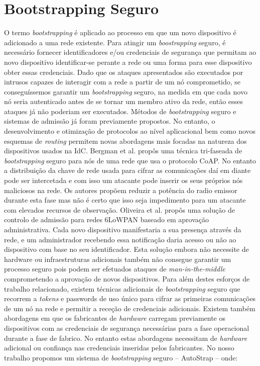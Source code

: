 \documentclass{llncs}
\begin{document}
\section{Bootstrapping Seguro}
\label{sec:secure_bootstrapping}
O termo \textit{bootstrapping} é aplicado ao processo em que um novo dispositivo é adicionado a uma rede existente. Para atingir um \textit{boostrapping} seguro, é necessário fornecer identificadores e/ou credenciais de segurança que permitam ao novo dispositivo identificar-se perante a rede ou uma forma para esse dispositivo obter essas credenciais. Dado que os ataques apresentados são executados por intrusos capazes de interagir com a rede a partir de um nó comprometido, se conseguíssemos garantir um \textit{bootstrapping} seguro, na medida em que cada novo nó seria autenticado antes de se tornar um membro ativo da rede, então esses ataques já não poderiam ser executados.
Métodos de \textit{bootstrapping} seguro e sistemas de admissão já foram previamente propostos. No entanto, o desenvolvimento e otimização de protocolos ao nível aplicacional bem como novos esquemas de \textit{routing} permitem novas abordagens mais focadas na natureza dos dispositivos usados na \ac{IdC}. Bergman et al.\cite{Bergmann2012} propôs uma técnica tri-faseada de \textit{bootstrapping} seguro para nós de uma rede que usa o protocolo \ac{CoAP}. No entanto a distribuição da chave de rede usada para cifrar as comunicações daí em diante pode ser intercetada e com isso um atacante pode inserir os seus próprios nós maliciosos na rede. Os autores propõem reduzir a potência do radio emissor durante esta fase mas não é certo que isso seja impedimento para um atacante com elevados recursos de observação.
Oliveira et al. \cite{Oliveira2013} propôs uma solução de controlo de admissão para redes \ac{6LoWPAN} baseado em aprovação administrativa. Cada novo dispositivo manifestaria a sua presença através da rede, e um administrador recebendo essa notificação daria acesso ou não ao dispositivo com base no seu identificador. Esta solução embora não necessite de hardware ou infraestruturas adicionais também não consegue garantir um processo seguro pois podem ser efetuados ataques de \textit{man-in-the-middle} comprometendo a aprovação de novos dispositivos.
Para além destes esforços de trabalho relacionado, existem técnicas adicionais de \textit{bootstrapping} seguro \cite{Fischer2012} que recorrem a \textit{tokens} e passwords de uso único para cifrar as primeiras comunicações de um nó na rede e permitir a receção de credenciais adicionais. Existem também abordagens em que os fabricantes de \textit{hardware} carregam previamente os dispositivos com as credenciais de segurança necessárias para a fase operacional durante a fase de fabrico. No entanto estas abordagens necessitam de \textit{hardware} adicional ou confiança nas credenciais inseridas pelos fabricantes. No nosso trabalho propomos um sistema de \textit{bootstrapping} seguro -- AutoStrap -- onde:
\end{document}
